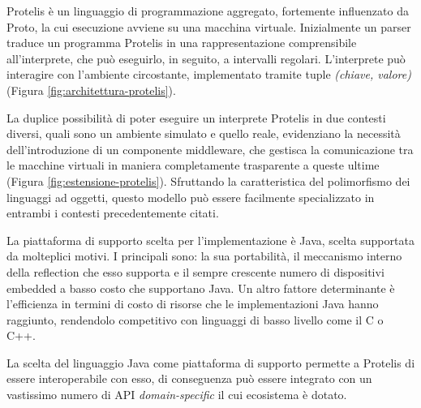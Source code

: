 Protelis è un linguaggio di programmazione aggregato, fortemente influenzato da
Proto\cite{Proto}, la cui esecuzione avviene su una macchina
virtuale\cite{Protelis}.  Inizialmente un parser traduce un programma Protelis
in una rappresentazione comprensibile all'interprete, che può eseguirlo, in
seguito, a intervalli regolari. L'interprete può interagire con l'ambiente
circostante, implementato tramite tuple \textit{(chiave, valore)} (Figura
\ref{fig:architettura-protelis}).

La duplice possibilità di poter eseguire un interprete Protelis in due contesti
diversi, quali sono un ambiente simulato e quello reale, evidenziano la
necessità dell'introduzione di un componente middleware, che gestisca la
comunicazione tra le macchine virtuali in maniera completamente trasparente a
queste ultime (Figura \ref{fig:estensione-protelis}). Sfruttando la
caratteristica del polimorfismo dei linguaggi ad oggetti, questo modello può
essere facilmente specializzato in entrambi i contesti precedentemente citati.

La piattaforma di supporto scelta per l'implementazione è Java, scelta
supportata da molteplici motivi\cite{Protelis}. I principali sono: la sua
portabilità, il meccanismo interno della reflection che esso supporta e il
sempre crescente numero di dispositivi embedded a basso costo che supportano
Java. Un altro fattore determinante è l'efficienza in termini di costo di
risorse che le implementazioni Java hanno raggiunto, rendendolo competitivo con
linguaggi di basso livello come il C o C++.

La scelta del linguaggio Java come piattaforma di supporto permette a Protelis
di essere interoperabile con esso, di conseguenza può essere integrato con un
vastissimo numero di API \textit{domain-specific} il cui ecosistema è dotato.

